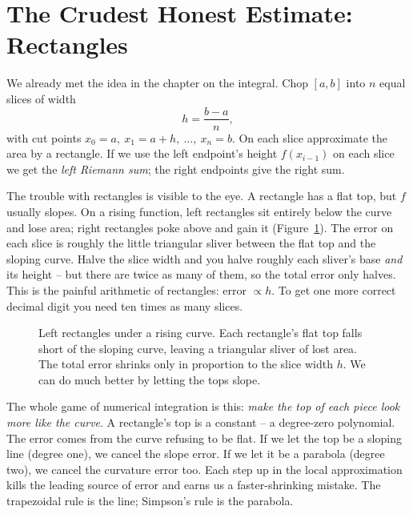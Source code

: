 \section{The Crudest Honest Estimate: Rectangles}
\label{ch27:rectangles}

We already met the idea in the chapter on the integral. Chop $[a,b]$ into $n$ equal slices of width
\[
h = \frac{b-a}{n},
\]
with cut points $x_0 = a,\ x_1 = a+h,\ \dots,\ x_n = b$. On each slice approximate the area by a rectangle. If we use the left endpoint's height $f(x_{i-1})$ on each slice we get the \emph{left Riemann sum}; the right endpoints give the right sum.

The trouble with rectangles is visible to the eye. A rectangle has a flat top, but $f$ usually slopes. On a rising function, left rectangles sit entirely below the curve and lose area; right rectangles poke above and gain it (Figure~\ref{ch27:fig-rect}). The error on each slice is roughly the little triangular sliver between the flat top and the sloping curve. Halve the slice width and you halve roughly each sliver's base \emph{and} its height -- but there are twice as many of them, so the total error only halves. This is the painful arithmetic of rectangles: error $\propto h$. To get one more correct decimal digit you need ten times as many slices.

\begin{figure}[H]
\centering
{}
\caption{Left rectangles under a rising curve. Each rectangle's flat top falls short of the sloping curve, leaving a triangular sliver of lost area. The total error shrinks only in proportion to the slice width $h$. We can do much better by letting the tops slope.}
\label{ch27:fig-rect}
\end{figure}

\begin{intuitionbox}
The whole game of numerical integration is this: \emph{make the top of each piece look more like the curve}. A rectangle's top is a constant -- a degree-zero polynomial. The error comes from the curve refusing to be flat. If we let the top be a sloping line (degree one), we cancel the slope error. If we let it be a parabola (degree two), we cancel the curvature error too. Each step up in the local approximation kills the leading source of error and earns us a faster-shrinking mistake. The trapezoidal rule is the line; Simpson's rule is the parabola.
\end{intuitionbox}

